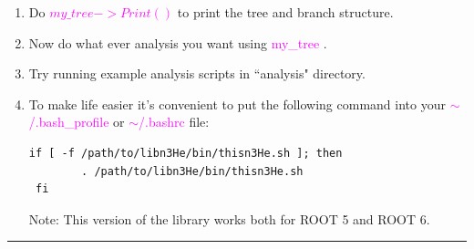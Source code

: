 \documentclass[12pt]{article}
\begin{document}
\begin{enumerate}
\item Do \textcolor{magenta}{$my\_tree->Print()$} to print the tree and branch structure.

\item Now do what ever analysis you want using \textcolor{magenta}{my\_tree }.

\item Try running example analysis scripts in ``analysis" directory.

\item To make life easier it's convenient to put the following command into your \textcolor{magenta}{$\sim$/.bash\_profile} or \textcolor{magenta}{$\sim$/.bashrc} file:

 
\begin{lstlisting}
if [ -f /path/to/libn3He/bin/thisn3He.sh ]; then 
        . /path/to/libn3He/bin/thisn3He.sh
 fi 
\end{lstlisting}

Note: This version of the library works both for ROOT 5 and ROOT 6.

\end{enumerate}

\noindent
{\color{red} \rule{\linewidth}{1mm} }
 
\newpage
\end{document}
